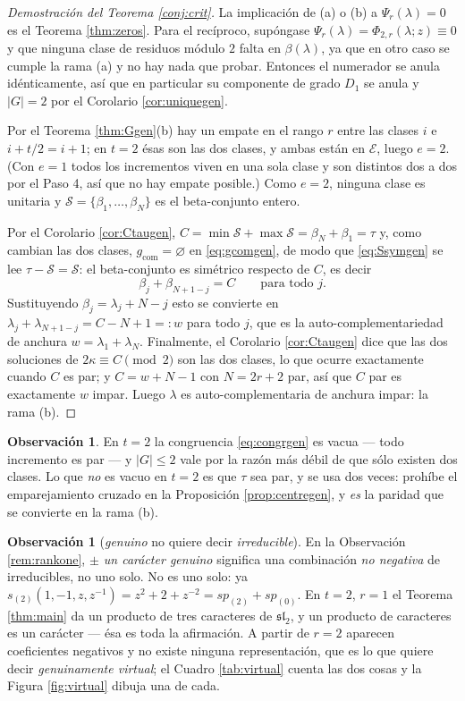 \documentclass[11pt,reqno]{amsart}
\theoremstyle{plain}
\theoremstyle{definition}
\newtheorem{remark}[theorem]{Observación}
\begin{document}
\begin{proof}[Demostración del Teorema \ref{conj:crit}]
La implicación de (a) o (b) a $\Psi_r(\lambda)=0$ es el Teorema \ref{thm:zeros}. Para el recíproco,
supóngase $\Psi_r(\lambda)=\Phi_{2,r}(\lambda;z)\equiv0$ y que ninguna clase de residuos módulo $2$
falta en $\beta(\lambda)$, ya que en otro caso se cumple la rama (a) y no hay nada que probar.
Entonces el numerador se anula idénticamente, así que en particular su componente de grado $D_1$ se
anula y $|G|=2$ por el Corolario \ref{cor:uniquegen}.

Por el Teorema \ref{thm:Ggen}(b) hay un empate en el rango $r$ entre las clases $i$ e $i+t/2=i+1$; en
$t=2$ ésas son las dos clases, y ambas están en $\mathcal{E}$, luego $e=2$. (Con $e=1$ todos los
incrementos viven en una sola clase y son distintos dos a dos por el Paso 4, así que no hay empate
posible.) Como $e=2$, ninguna clase es unitaria y $\mathcal{S}=\{\beta_1,\dots,\beta_N\}$ es el
beta-conjunto entero.

Por el Corolario \ref{cor:Ctaugen}, $C=\min\mathcal{S}+\max\mathcal{S}=\beta_N+\beta_1=\tau$ y, como
cambian las dos clases, $g_{\mathrm{com}}=\varnothing$ en \eqref{eq:gcomgen}, de modo que
\eqref{eq:Ssymgen} se lee $\tau-\mathcal{S}=\mathcal{S}$: el beta-conjunto es simétrico respecto de
$C$, es decir
\[
  \beta_j+\beta_{N+1-j}=C\qquad\text{para todo }j .
\]
Sustituyendo $\beta_j=\lambda_j+N-j$ esto se convierte en $\lambda_j+\lambda_{N+1-j}=C-N+1=:w$ para
todo $j$, que es la auto-complementariedad de anchura $w=\lambda_1+\lambda_N$. Finalmente, el
Corolario \ref{cor:Ctaugen} dice que las dos soluciones de $2\kappa\equiv C\pmod2$ son las dos
clases, lo que ocurre exactamente cuando $C$ es par; y $C=w+N-1$ con $N=2r+2$ par, así que $C$ par es
exactamente $w$ impar. Luego $\lambda$ es auto-complementaria de anchura impar: la rama (b).
\end{proof}

\begin{remark}
En $t=2$ la congruencia \eqref{eq:congrgen} es vacua --- todo incremento es par --- y $|G|\le2$ vale
por la razón más débil de que sólo existen dos clases. Lo que \emph{no} es vacuo en $t=2$ es que
$\tau$ sea par, y se usa dos veces: prohíbe el emparejamiento cruzado en la Proposición
\ref{prop:centregen}, y \emph{es} la paridad que se convierte en la rama (b).
\end{remark}

\begin{remark}[\emph{genuino} no quiere decir \emph{irreducible}]
En la Observación \ref{rem:rankone}, \emph{$\pm$ un carácter genuino} significa una combinación
\emph{no negativa} de irreducibles, no uno solo. No es uno solo: ya
$s_{(2)}(1,-1,z,z^{-1})=z^{2}+2+z^{-2}=sp_{(2)}+sp_{(0)}$. En $t=2$, $r=1$ el Teorema
\ref{thm:main} da un producto de tres caracteres de $\mathfrak{sl}_2$, y un producto de caracteres es
un carácter --- ésa es toda la afirmación. A partir de $r=2$ aparecen coeficientes negativos y no
existe ninguna representación, que es lo que quiere decir \emph{genuinamente virtual}; el Cuadro
\ref{tab:virtual} cuenta las dos cosas y la Figura \ref{fig:virtual} dibuja una de cada.
\end{remark}
\end{document}
